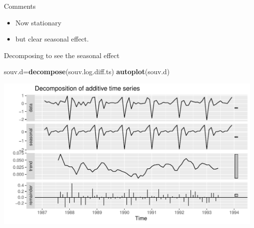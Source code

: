 \documentclass[ignorenonframetext,]{beamer}
\newenvironment{Shaded}{\begin{snugshade}}{\end{snugshade}}
\newcommand{\KeywordTok}[1]{\textcolor[rgb]{0.13,0.29,0.53}{\textbf{#1}}}
\newcommand{\NormalTok}[1]{#1}
\providecommand{\tightlist}{%
  \setlength{\itemsep}{0pt}\setlength{\parskip}{0pt}}
\begin{document}
\begin{frame}{Comments}
\protect\hypertarget{comments-44}{}

\begin{itemize}
\tightlist
\item
  Now stationary
\item
  but clear seasonal effect.
\end{itemize}

\end{frame}

\begin{frame}[fragile]{Decomposing to see the seasonal effect}
\protect\hypertarget{decomposing-to-see-the-seasonal-effect}{}

\begin{Shaded}
\begin{Highlighting}[]
\NormalTok{souv.d=}\KeywordTok{decompose}\NormalTok{(souv.log.diff.ts)}
\KeywordTok{autoplot}\NormalTok{(souv.d)}
\end{Highlighting}
\end{Shaded}

\includegraphics{figure/unnamed-chunk-543-1.pdf}

\end{frame}
\end{document}
